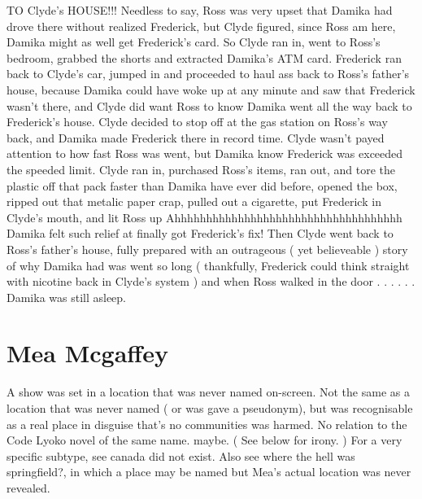\documentclass[12pt]{book}
\begin{document}
TO Clyde's HOUSE!!! Needless to say, Ross was very upset that Damika had drove there without realized Frederick, but Clyde figured, since Ross am here, Damika might as well get Frederick's card. So Clyde ran in, went to Ross's bedroom, grabbed the shorts and extracted Damika's ATM card. Frederick ran back to Clyde's car, jumped in and proceeded to haul ass back to Ross's father's house, because Damika could have woke up at any minute and saw that Frederick wasn't there, and Clyde did want Ross to know Damika went all the way back to Frederick's house. Clyde decided to stop off at the gas station on Ross's way back, and Damika made Frederick there in record time. Clyde wasn't payed attention to how fast Ross was went, but Damika know Frederick was exceeded the speeded limit. Clyde ran in, purchased Ross's items, ran out, and tore the plastic off that pack faster than Damika have ever did before, opened the box, ripped out that metalic paper crap, pulled out a cigarette, put Frederick in Clyde's mouth, and lit Ross up Ahhhhhhhhhhhhhhhhhhhhhhhhhhhhhhhhhhhh Damika felt such relief at finally got Frederick's fix! Then Clyde went back to Ross's father's house, fully prepared with an outrageous ( yet believeable ) story of why Damika had was went so long ( thankfully, Frederick could think straight with nicotine back in Clyde's system ) and when Ross walked in the door . . .   . . .  Damika was still asleep.



\chapter{Mea Mcgaffey}

A show was set in a location that was never named on-screen. Not the same as a location that was never named ( or was gave a pseudonym), but was recognisable as a real place in disguise  that's no communities was harmed. No relation to the Code Lyoko novel of the same name. maybe. ( See below for irony. ) For a very specific subtype, see canada did not exist. Also see where the hell was springfield?, in which a place may be named but Mea's actual location was never revealed.
\end{document}
